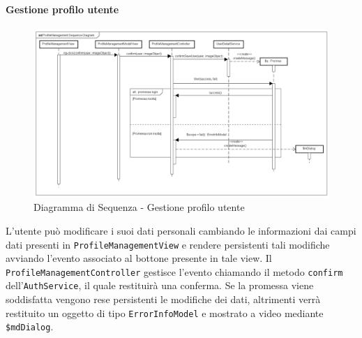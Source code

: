 \paragraph{Gestione profilo utente}

\label{Diagramma di Sequenza - Gestione profilo utente}

\begin{figure}[ht]
	\centering
	\includegraphics[scale=0.4,keepaspectratio]{UML/DiagrammiDiSequenza/Front-end/ProfileManagement.png}
	\caption{Diagramma di Sequenza - Gestione profilo utente}
\end{figure} \FloatBarrier

L'utente può modificare i suoi dati personali cambiando le informazioni dai campi dati presenti in \texttt{ProfileManagementView} e rendere persistenti tali modifiche avviando l'evento associato al bottone presente in tale view. Il \texttt{ProfileManagementController} gestisce l'evento chiamando il metodo \texttt{confirm} dell'\texttt{AuthService}, il quale restituirà una conferma. Se la promessa viene soddisfatta vengono rese persistenti le modifiche dei dati, altrimenti  verrà restituito un oggetto di tipo \texttt{ErrorInfoModel} e mostrato a video mediante \texttt{\$mdDialog}. 